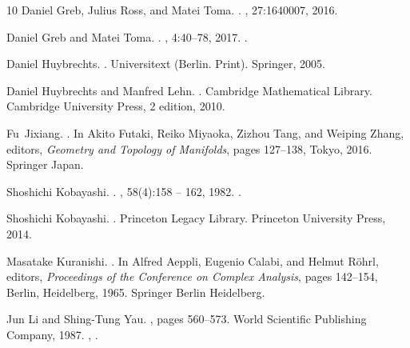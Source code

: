 \documentclass{article}
\theoremstyle{remark}
\theoremstyle{definition}
\begin{document}
\begin{thebibliography}{10}
Daniel Greb, Julius Ross, and Matei Toma.
.
, 27:1640007, 2016.

Daniel Greb and Matei Toma.
.
, 4:40--78, 2017.
\newblock \href {https://doi.org/10.14231/AG-2017-003} {}.

Daniel Huybrechts.
.
\newblock Universitext (Berlin. Print). Springer, 2005.

Daniel Huybrechts and Manfred Lehn.
.
\newblock Cambridge Mathematical Library. Cambridge University Press, 2 edition, 2010.

Fu~Jixiang.
.
\newblock In Akito Futaki, Reiko Miyaoka, Zizhou Tang, and Weiping Zhang, editors, {\em {Geometry and Topology of Manifolds}}, pages 127--138, Tokyo, 2016. Springer Japan.

Shoshichi Kobayashi.
.
, 58(4):158 -- 162, 1982.
\newblock \href {https://doi.org/10.3792/pjaa.58.158} {}.

Shoshichi Kobayashi.
.
\newblock Princeton Legacy Library. Princeton University Press, 2014.

Masatake Kuranishi.
.
\newblock In Alfred Aeppli, Eugenio Calabi, and Helmut R{\"o}hrl, editors, {\em {Proceedings of the Conference on Complex Analysis}}, pages 142--154, Berlin, Heidelberg, 1965. Springer Berlin Heidelberg.

Jun Li and Shing-Tung Yau.
, pages 560--573.
\newblock World Scientific Publishing Company, 1987.
\newblock \href {https://arxiv.org/abs/https://worldscientific.com/doi/pdf/10.1142/9789812798411_0027} {}, \href {https://doi.org/10.1142/9789812798411_0027} {}.


\end{thebibliography}
\end{document}
